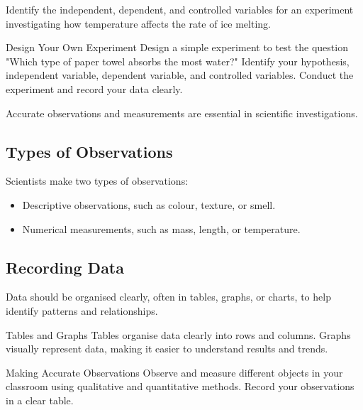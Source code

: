 \begin{stopandthink}
Identify the independent, dependent, and controlled variables for an experiment investigating how temperature affects the rate of ice melting.
\end{stopandthink}

\begin{investigation}{Design Your Own Experiment}
Design a simple experiment to test the question "Which type of paper towel absorbs the most water?" Identify your hypothesis, independent variable, dependent variable, and controlled variables. Conduct the experiment and record your data clearly.
\end{investigation}

\FloatBarrier

Accurate observations and measurements are essential in scientific investigations.

\subsection{Types of Observations}

Scientists make two types of observations:

\begin{itemize}
    \item {} Descriptive observations, such as colour, texture, or smell.
    \item {} Numerical measurements, such as mass, length, or temperature.
\end{itemize}

\subsection{Recording Data}

Data should be organised clearly, often in tables, graphs, or charts, to help identify patterns and relationships.

\begin{keyconcept}{Tables and Graphs}
Tables organise data clearly into rows and columns. Graphs visually represent data, making it easier to understand results and trends.
\end{keyconcept}

\begin{investigation}{Making Accurate Observations}
Observe and measure different objects in your classroom using qualitative and quantitative methods. Record your observations in a clear table.
\end{investigation}

